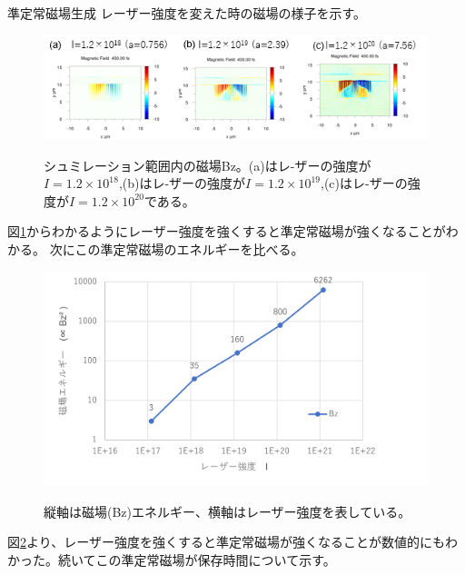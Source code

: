 \documentclass[a4paper,11pt,titlepage]{jarticle}
\numberwithin{equation}{section} %
\begin{document}
  {準定常磁場生成}
  レーザー強度を変えた時の磁場の様子を示す。
  
  \begin{figure}[H]
    \begin{center}
      \includegraphics[scale=0.9]{./image/4-23-10rod.png}
      \label{fig:4-4-15}
      \caption{シュミレーション範囲内の磁場Bz。(a)はレ-ザーの強度が$I=1.2 \times 10^{18}$,(b)はレ-ザーの強度が$I=1.2 \times 10^{19}$,(c)はレ-ザーの強度が$I=1.2 \times 10^{20}$である。}
    \end{center}
  \end{figure}
  
  図\ref*{fig:4-4-15}からわかるようにレーザー強度を強くすると準定常磁場が強くなることがわかる。
  次にこの準定常磁場のエネルギーを比べる。
  
  
  \begin{figure}[H]
    \begin{center}
      \includegraphics[scale=0.75]{./image/4-24-10rod.png}
      \label{fig:4-4-16}
      \caption{縦軸は磁場(Bz)エネルギー、横軸はレーザー強度を表している。}
    \end{center}
  \end{figure}
  
  図\ref*{fig:4-4-16}より、レーザー強度を強くすると準定常磁場が強くなることが数値的にもわかった。続いてこの準定常磁場が保存時間について示す。
  
\end{document}
